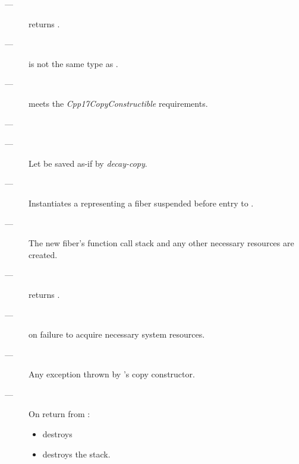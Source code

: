 \postcond
\begin{description}
    \item[---]  returns .
\end{description}


\constraints
\begin{description}
    \item[---]  is not the same type as .
\end{description}

\mandates
\begin{description}
    \item[---]  meets the \emph{Cpp17CopyConstructible} requirements.
    \item[---] 
\end{description}

\effects
\begin{description}
    \item[---] Let  be saved as-if by \emph{decay-copy}.
    \item[---] Instantiates a \fiber representing a fiber suspended before
              entry to .
    \item[---] The new fiber's function call stack and any other necessary
              resources are created.
\end{description}

\postcond
\begin{description}
    \item[---]  returns .
\end{description}

\except
\begin{description}
    \item[---]  on failure to acquire necessary system
               resources.
    \item[---] Any exception thrown by 's copy constructor.
\end{description}

\remarks
\begin{description}
    \item[---] On return from :
        \begin{itemize}
            \item destroys 
            \item destroys the stack.
        \end{itemize}
\end{description}

